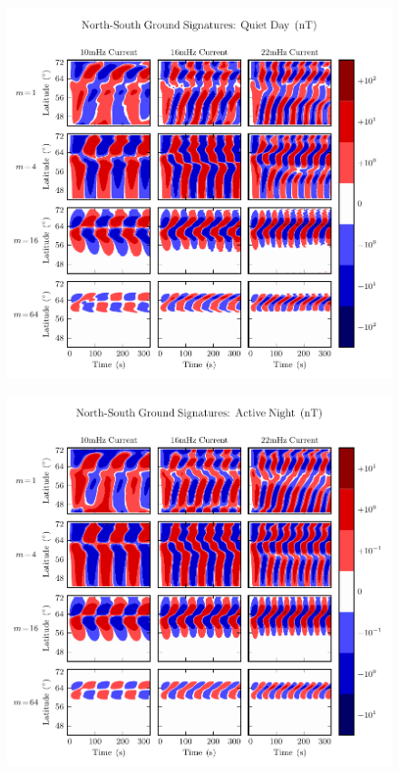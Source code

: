 \begin{figure}[H]
    \centering
    \includegraphics[width=\textwidth]{figures/BqE_J_2.pdf}
    \caption[North-South Ground Signatures: Quiet Day]{}
    \label{fig_BqE_J_2}
\end{figure}

\begin{figure}[H]
    \centering
    \includegraphics[width=\textwidth]{figures/BqE_J_3.pdf}
    \caption[North-South Ground Signatures: Active Night]{}
    \label{fig_BqE_J_3}
\end{figure}


